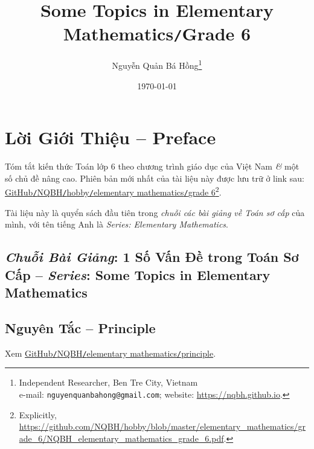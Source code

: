 \documentclass[oneside]{book}
\title{Some Topics in Elementary Mathematics\texttt{/}Grade 6}
\author{Nguyễn Quản Bá Hồng\footnote{Independent Researcher, Ben Tre City, Vietnam\\e-mail: \texttt{nguyenquanbahong@gmail.com}; website: \url{https://nqbh.github.io}.}}
\date{\today}
\numberwithin{equation}{section}
\begin{document}
\maketitle
\setcounter{secnumdepth}{4}
\setcounter{tocdepth}{3}
\tableofcontents
\newpage


\chapter*{Lời Giới Thiệu -- Preface}

Tóm tắt kiến thức Toán lớp 6 theo chương trình giáo dục của Việt Nam \textit{\&} một số chủ đề nâng cao. Phiên bản mới nhất của tài liệu này được lưu trữ ở link sau: \href{https://github.com/NQBH/hobby/blob/master/elementary_mathematics/grade_6/NQBH_elementary_mathematics_grade_6.pdf}{GitHub\texttt{/}NQBH\texttt{/}hobby\texttt{/}elementary mathematics\texttt{/}grade 6}\footnote{Explicitly, \url{https://github.com/NQBH/hobby/blob/master/elementary_mathematics/grade_6/NQBH_elementary_mathematics_grade_6.pdf}.}.

Tài liệu này là quyển sách đầu tiên trong \textit{chuỗi các bài giảng về Toán sơ cấp} của mình, với tên tiếng Anh là \textit{Series: Elementary Mathematics}.

\section*{\textit{Chuỗi Bài Giảng}: 1 Số Vấn Đề trong Toán Sơ Cấp -- \textit{Series}: Some Topics in Elementary Mathematics}


\section*{Nguyên Tắc -- Principle}
Xem \href{https://github.com/NQBH/hobby/blob/master/elementary_mathematics/principle/NQBH_elementary_mathematics_principle.pdf}{GitHub\texttt{/}NQBH\texttt{/}elementary mathematics\texttt{/}principle}.
\end{document}
